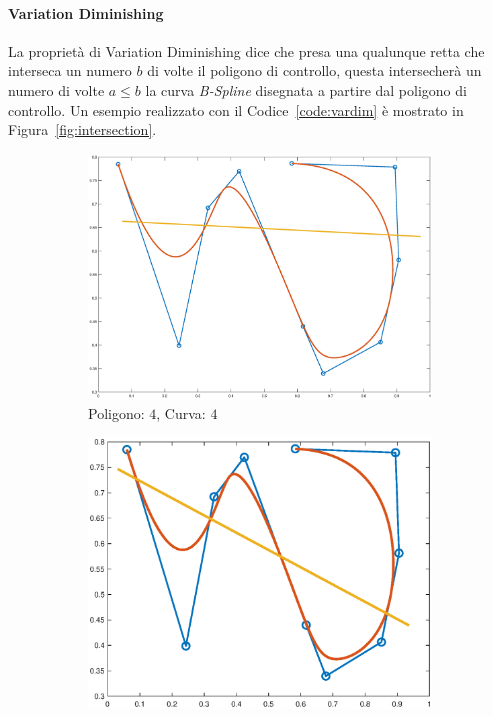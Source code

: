 \documentclass[a4paper, 12pt]{article}
\begin{document}
\paragraph{Variation Diminishing}
La proprietà di Variation Diminishing dice che presa una qualunque retta che interseca
un numero $b$ di volte il poligono di controllo, questa intersecherà un numero di volte $a \leq b$ la curva \textit{B-Spline} 
disegnata a partire dal poligono di controllo. 
Un esempio realizzato con il Codice~\ref{code:vardim} è mostrato in Figura~\ref{fig:intersection}.

\begin{figure}[]
  \centering
  \begin{subfigure}[b]{0.3\textwidth}
    \includegraphics[width=\textwidth]{figure/intersection1.eps}
    \caption{Poligono: $4$, Curva: $4$}
    \label{fig:intersection1}
  \end{subfigure}
  \begin{subfigure}[b]{0.3\textwidth}
      \includegraphics[width=\textwidth]{figure/intersection3.eps}

\end{subfigure}
\end{figure}
\end{document}
